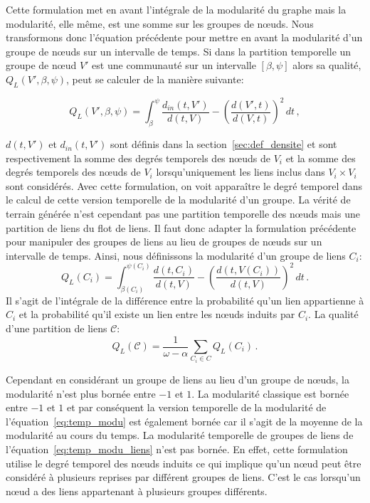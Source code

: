 Cette formulation met en avant l'intégrale de la modularité du graphe mais la modularité, elle même, est une somme sur les groupes de n\oe{}uds.
Nous transformons donc l'équation précédente pour mettre en avant la modularité d'un groupe de n\oe{}uds sur un intervalle de temps.
Si dans la partition temporelle un groupe de n\oe{}ud $V'$ est une communauté sur un intervalle $[\beta, \psi]$ alors sa qualité, $Q_L(V', \beta, \psi)$, peut se calculer de la manière suivante:

\begin{equation}
Q_L(V', \beta, \psi)  = \int_{\beta}^{\psi} \! \dfrac{d_{in}(t,V')}{d(t,V)} - \left( \dfrac{d(V',t)}{d(V,t)} \right)^2  \, dt\, ,
\end{equation}

$d(t,V')$ et $d_{in}(t,V')$ sont définis dans la section~\ref{sec:def_densite} et sont respectivement la somme des degrés temporels des n\oe{}uds de $V_i$ et la somme des degrés temporels des n\oe{}uds de $V_i$ lorsqu'uniquement les liens inclus dans $V_i \times V_i$ sont considérés.
Avec cette formulation, on voit apparaître le degré temporel dans le calcul de cette version temporelle de la modularité d'un groupe.
La vérité de terrain générée n'est cependant pas une partition temporelle des n\oe{}uds mais une partition de liens du flot de liens.
Il faut donc adapter la formulation précédente pour manipuler des groupes de liens au lieu de groupes de n\oe{}uds sur un intervalle de temps.
Ainsi, nous définissons la modularité d'un groupe de liens $C_i$:
\begin{equation}
Q_L(C_i)  = \int_{\beta(C_i)}^{\psi(C_i)} \! \dfrac{d(t,C_i)}{d(t,V)} -  \left( \dfrac{d(t,V(C_i))}{d(t,V)} \right)^2 \, dt \,.
\label{}
\end{equation}
Il s'agit de l'intégrale de la différence entre la probabilité qu'un lien appartienne à $C_i$ et la probabilité qu'il existe un lien entre les n\oe{}uds induits par $C_i$.
La qualité d'une partition de liens $\mathcal{C}$:
\begin{equation}
Q_L(\mathcal{C}) = \dfrac{1}{\omega-\alpha} \sum_{C_i \in C} Q_L(C_i)\, .
\label{eq:temp_modu_liens}
\end{equation}

Cependant en considérant un groupe de liens au lieu d'un groupe de n\oe{}uds, la modularité n'est plus bornée entre $-1$ et $1$.
La modularité classique est bornée entre $-1$ et $1$ et par conséquent la version temporelle de la modularité de l'équation~\ref{eq:temp_modu} est également bornée car il s'agit de la moyenne de la modularité au cours du temps.
La modularité temporelle de groupes de liens de l'équation~\ref{eq:temp_modu_liens} n'est pas bornée.
En effet, cette formulation utilise le degré temporel des n\oe{}uds induits ce qui implique qu'un n\oe{}ud peut être considéré à plusieurs reprises par différent groupes de liens.
C'est le cas lorsqu'un n\oe{}ud a des liens appartenant à plusieurs groupes différents.

